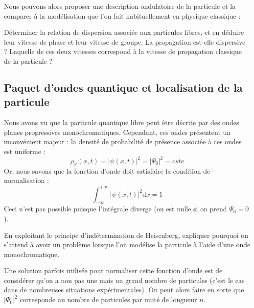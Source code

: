 \documentclass[11pt,fleqn]{book} %
\newcommand{\dd}{\mathrm{d}}
\begin{document}
Nous pouvons alors proposer une description ondulatoire de la particule et la comparer à la modélisation que l'on fait habituellement en physique classique :

\begin{capex}
	Déterminer la relation de dispersion associée aux particules libres, et en déduire leur vitesse de phase et leur vitesse de groupe. La propagation est-elle dispersive ? Laquelle de ces deux vitesses correspond à la vitesse de propagation classique de la particule ?
\end{capex}

\subsection{Paquet d'ondes quantique et localisation de la particule}

Nous avons vu que la particule quantique libre peut être décrite par des ondes planes progressives monochromatiques. Cependant, ces ondes présentent un inconvénient majeur : la densité de probabilité de présence associée à ces ondes est uniforme :
\begin{equation}
	\rho_{\mathbb{P}}(x,t) = |\psi(x,t)|^2 = |\Psi_0|^2 = cste
\end{equation}
Or, nous savons que la fonction d'onde doit satisfaire la condition de normalisation :
\begin{equation}
	\int_{-\infty}^{+\infty} |\psi(x,t)|^2 \dd x = 1
\end{equation}
Ceci n'est pas possible puisque l'intégrale diverge (ou est nulle si on prend $\Psi_0 = 0$).

\begin{capex}
	En exploitant le principe d'indétermination de Heisenberg, expliquer pourquoi on s'attend à avoir un problème lorsque l'on modélise la particule à l'aide d'une onde monochromatique.
\end{capex}

\begin{remark}
	Une solution parfois utilisée pour normaliser cette fonction d'onde est de considérer qu'on a non pas une mais un grand nombre de particules (c'est le cas dans de nombreuses situations expérimentales). On peut alors faire en sorte que $|\Psi_0|^2$ corresponde au nombre de particules par unité de longueur $n$.
\end{remark}
\end{document}

